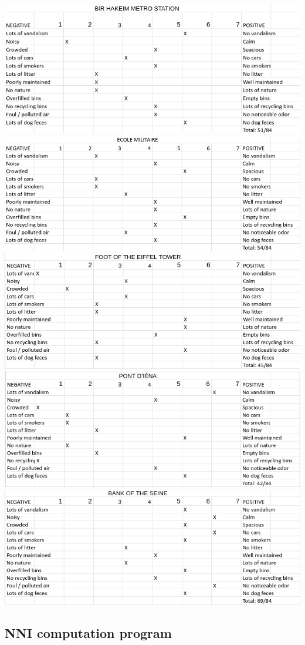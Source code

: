 \documentclass[11pt,letterpaper]{article}
\begin{document}
\includegraphics[width=0.5\linewidth]{media/bipolar/birhakeim.png}
\includegraphics[width=0.5\linewidth]{media/bipolar/ecolemilitaire.png}
\includegraphics[width=0.5\linewidth]{media/bipolar/eiffel.png}
\includegraphics[width=0.5\linewidth]{media/bipolar/iena.png}
\includegraphics[width=0.5\linewidth]{media/bipolar/seinebank.png}

\subsection{NNI computation program}
\label{app:program}

\end{document}
